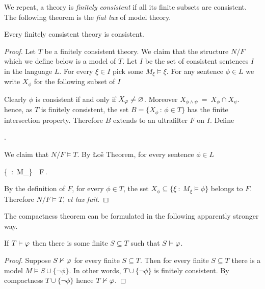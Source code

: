 \documentclass[creche.tex]{subfiles}
\begin{document}
We repeat, a theory is \emph{finitely consistent\/} if all its finite subsets are consistent. The following theorem is the \textit{fiat lux\/} of model theory. 

\begin{void_thm}\label{thmcompattezza}
Every finitely consistent theory is consistent. 
\end{void_thm}

\begin{proof}
Let  $T$ be a finitely consistent theory. We claim that the structure $N/F$ which we define below is a model of $T$. Let $I$ be the set of consistent sentences $I$ in the language $L$. For every $\xi\in I$ pick some $M_\xi\models\xi$. For any sentence $\phi\in L$ we write $X_\phi$ for the following subset of $I$


Clearly $\phi$ is consistent if and only if $X_\varphi\neq\varnothing$. Moreover $X_{\phi\wedge\psi}\ =\ X_\phi\cap X_\psi$. hence, as $T$ is finitely consistent, the set $B=\big\{X_\phi\,:\,\phi\in T\big\}$ has the finite intersection property. Therefore $B$ extends to an ultrafilter $F$ on $I$. Define

.

We claim that $N/F\models T$. By \L o\v{s} Theorem, for every sentence $\phi\in L$

%
{\IFF}%
{\Big\{\xi\ :\ M_\xi\models\phi\Big\}\ \in\ F\,.}

By the definition of $F$, for every $\phi\in T$, the set $X_\phi\subseteq \big\{\xi\ :\ M_\xi\models \phi\big\}$ belongs to $F$. Therefore $N/F\models T$, \textit{et lux fuit}.
\end{proof}

The compactness theorem can be formulated in the following apparently stronger way.

\begin{corollary}\label{compattezza2}
If $T\vdash\varphi$ then there is some finite $S\subseteq T$ such that $S\vdash\varphi$.
\end{corollary}

\begin{proof}
Suppose $S\nvdash\varphi$ for every finite $S\subseteq T$. Then for every finite $S\subseteq T$ there is a model $M\models S\cup\{\neg\phi\}$. In other words, $T\cup\{\neg\phi\}$ is finitely consistent. By compactness $T\cup\{\neg\phi\}$ hence $T\nvdash \varphi$.
\end{proof}
\end{document}
